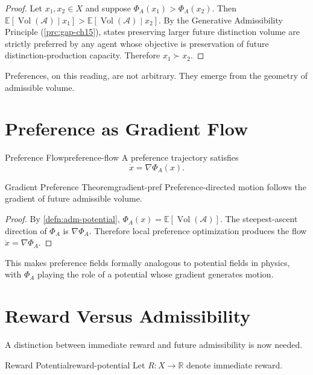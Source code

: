 \documentclass[12pt,twoside,openright]{book}
\newcommand{\adm}{\mathcal{A}}
\newcommand{\Vol}{\operatorname{Vol}}
\begin{document}
\begin{proof}
  Let $x_1, x_2 \in X$ and suppose
  $\Phi_A(x_1) > \Phi_A(x_2)$. Then
  $\mathbb{E}[\Vol(\adm) \mid x_1] > \mathbb{E}[\Vol(\adm) \mid x_2]$.
  By the Generative Admissibility Principle
  (\cref{prc:gap-ch15}), states preserving larger future
  distinction volume are strictly preferred by any agent
  whose objective is preservation of future
  distinction-production capacity. Therefore $x_1 \succ x_2$.
\end{proof}

Preferences, on this reading, are not arbitrary. They
emerge from the geometry of admissible volume.

\section{Preference as Gradient Flow}
\label{sec:ch22-gradient}

\begin{definition}{Preference Flow}{preference-flow}
  A preference trajectory satisfies
  \[
    \dot{x} = \nabla\Phi_A(x).
  \]
\end{definition}

\begin{theorem}{Gradient Preference Theorem}{gradient-pref}
  Preference-directed motion follows the gradient of future
  admissible volume.
\end{theorem}

\begin{proof}
  By \cref{defn:adm-potential}, $\Phi_A(x) = \mathbb{E}[\Vol(\adm)]$.
  The steepest-ascent direction of $\Phi_A$ is $\nabla\Phi_A$.
  Therefore local preference optimization produces the flow
  $\dot{x} = \nabla\Phi_A$.
\end{proof}

This makes preference fields formally analogous to
potential fields in physics, with $\Phi_A$ playing the role
of a potential whose gradient generates motion.

\section{Reward Versus Admissibility}
\label{sec:ch22-divergence}

A distinction between immediate reward and future
admissibility is now needed.

\begin{definition}{Reward Potential}{reward-potential}
  Let $R : X \to \mathbb{R}$ denote immediate reward.
\end{definition}
\end{document}
